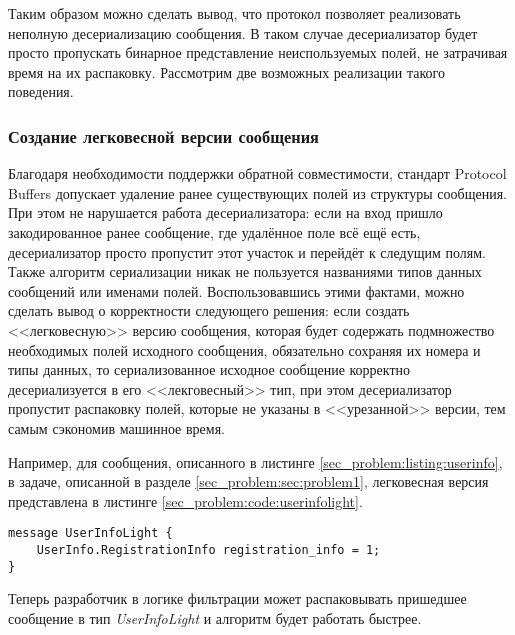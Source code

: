Таким образом можно сделать вывод, что протокол позволяет реализовать неполную десериализацию сообщения.
В таком случае десериализатор будет просто пропускать бинарное представление неиспользуемых полей, не затрачивая время на их распаковку.
Рассмотрим две возможных реализации такого поведения.

\pagebreak

\subsubsection{Создание легковесной версии сообщения}

Благодаря необходимости поддержки обратной совместимости, стандарт Protocol Buffers допускает удаление ранее существующих полей из структуры сообщения.
При этом не нарушается работа десериализатора: если на вход пришло закодированное ранее сообщение, где удалённое поле всё ещё есть, десериализатор просто пропустит
этот участок и перейдёт к следущим полям. 
Также алгоритм сериализации никак не пользуется названиями типов данных сообщений или именами полей.
Воспользовавшись этими фактами, можно сделать вывод о корректности следующего решения: если создать <<легковесную>> версию сообщения, которая будет содержать подмножество
необходимых полей исходного сообщения, обязательно сохраняя их номера и типы данных, то сериализованное исходное сообщение корректно десериализуется в его <<лекговесный>>
тип, при этом десериализатор пропустит распаковку полей, которые не указаны в <<урезанной>> версии, тем самым сэкономив машинное время.

Например, для сообщения, описанного в листинге \ref{sec_problem:listing:userinfo}, в задаче, описанной в 
разделе \ref{sec_problem:sec:problem1}, легковесная версия представлена в листинге \ref{sec_problem:code:userinfolight}.
\begin{lstlisting}[style=CodeListing, label={sec_problem:code:userinfolight}, caption={Легковесная версия сообщения UserInfo}]
message UserInfoLight {
    UserInfo.RegistrationInfo registration_info = 1;
}
\end{lstlisting}

Теперь разработчик в логике фильтрации может распаковывать пришедшее сообщение в тип \textit{UserInfoLight} и алгоритм будет работать быстрее.

